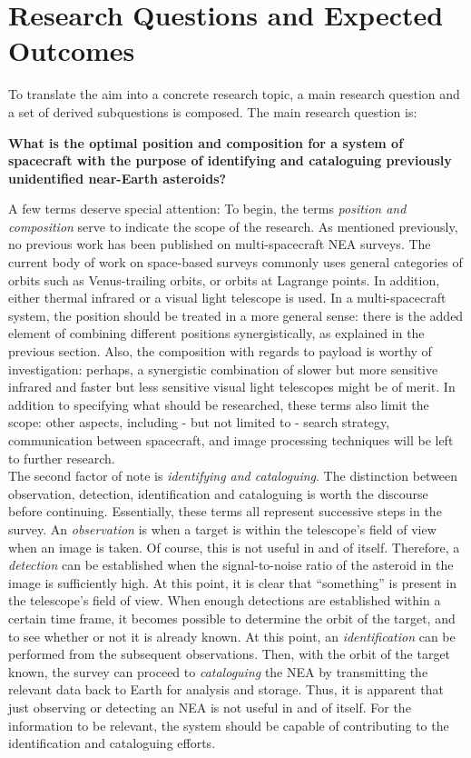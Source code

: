 \section{Research Questions and Expected Outcomes}
\label{sec:researchquestions}

To translate the aim into a concrete research topic, a main research question and a set of derived subquestions is composed. The main research question is:

\begin{center}\large\textbf{What is the optimal position and composition for a system of spacecraft with the purpose of identifying and cataloguing previously unidentified near-Earth asteroids?}\end{center}

A few terms deserve special attention: To begin, the terms \textit{position and composition} serve to indicate the scope of the research. As mentioned previously, no previous work has been published on multi-spacecraft NEA surveys. The current body of work on space-based surveys commonly uses general categories of orbits such as Venus-trailing orbits, or orbits at Lagrange points. In addition, either thermal infrared or a visual light telescope is used. In a multi-spacecraft system, the position should be treated in a more general sense: there is the added element of combining different positions synergistically, as explained in the previous section. Also, the composition with regards to payload is worthy of investigation: perhaps, a synergistic combination of slower but more sensitive infrared and faster but less sensitive visual light telescopes might be of merit. In addition to specifying what should be researched, these terms also limit the scope: other aspects, including - but not limited to - search strategy, communication between spacecraft, and image processing techniques will be left to further research. \\

The second factor of note is \textit{identifying and cataloguing}. The distinction between observation, detection, identification and cataloguing is worth the discourse before continuing. Essentially, these terms all represent successive steps in the survey. An \textit{observation} is when a target is within the telescope's field of view when an image is taken. Of course, this is not useful in and of itself. Therefore, a \textit{detection} can be established when the signal-to-noise ratio of the asteroid in the image is sufficiently high. At this point, it is clear that ``something'' is present in the telescope's field of view. When enough detections are established within a certain time frame, it becomes possible to determine the orbit of the target, and to see whether or not it is already known. At this point, an \textit{identification} can be performed from the subsequent observations. Then, with the orbit of the target known, the survey can proceed to \textit{cataloguing} the NEA by transmitting the relevant data back to Earth for analysis and storage. Thus, it is apparent that just observing or detecting an NEA is not useful in and of itself. For the information to be relevant, the system should be capable of contributing to the identification and cataloguing efforts. \\

